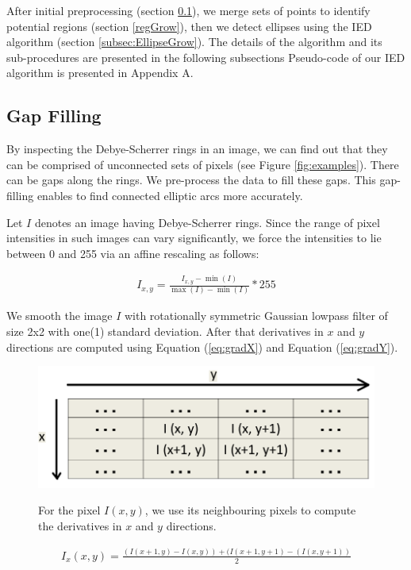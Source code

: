 \documentclass[preprint]{iucr}              %
\newcommand\dsrs{Debye-Scherrer rings}
\begin{document}
After initial pre\-processing (section \ref{sec:gapFilling}), we merge sets of
points to identify potential regions (section \ref{regGrow}), then we detect
ellipses using the IED algorithm (section \ref{subsec:EllipseGrow}).  
The details of the algorithm and its sub-procedures are presented in the
following subsections Pseudo-code of our IED algorithm is presented in Appendix
A.  

\subsection{Gap Filling} \label{sec:gapFilling}
By inspecting the \dsrs{} in an image, we can find out that they can be
comprised of unconnected sets of pixels (see Figure \ref{fig:examples}). 
There can be gaps along the rings.
We pre-process the data to fill these gaps.
This gap-filling enables to find connected elliptic arcs more accurately.

Let $I$ denotes an image having {\dsrs}.
Since the range of pixel intensities in such images can vary significantly, we
force the intensities to lie between 0 and 255 via an affine rescaling as
follows:  

\begin{align} \label{eq:affine}    
    I_{x,y} = \frac{I_{x,y} - \min(I)}{\max(I) - \min(I)} * 255    
\end{align}

We smooth the image $I$ with rotationally symmetric Gaussian lowpass filter of
size 2x2 with one(1) standard deviation. 
After that derivatives in $x$ and $y$ directions are computed using Equation
(\ref{eq:gradX}) and Equation (\ref{eq:gradY}). 

\begin{figure}
\includegraphics[width=.45\linewidth]{Figures/Gradiant_Pixels_grid.png}
\label{fig:grid}
\caption{For the pixel $I(x,y)$, we use its neighbouring pixels to compute the
derivatives in $x$ and $y$ directions.} 
\end{figure}


\begin{align} \label{eq:gradX}
I_{x}(x,y) = \frac{(I(x+1,y)-I(x,y)) + (I(x+1,y+1)-(I(x,y+1))}{2}
\end{align}
\end{document}
